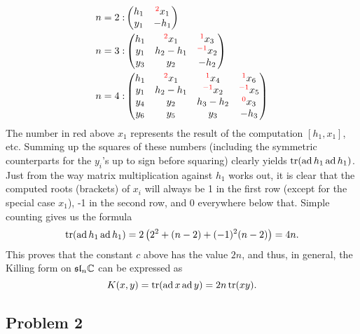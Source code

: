 \documentclass{../../mathnotes}
\begin{document}
\begin{align*}
    n=2: &
    \begin{pmatrix}
        h_1&^{\color{red}{2}}x_1\\y_1&-h_1
    \end{pmatrix}\\
    n=3: &
    \begin{pmatrix}
        h_1&^{\color{red}{2}}x_1&^{\color{red}{1}}x_3\\y_1&h_2-h_1&^{\color{red}{-1}}x_2\\y_3&y_2&-h_2
    \end{pmatrix}\\
    n=4: &
    \begin{pmatrix}
        h_1&^{\color{red}{2}}x_1&^{\color{red}{1}}x_4&^{\color{red}{1}}x_6\\y_1&h_2-h_1&^{\color{red}{-1}}x_2&^{\color{red}{-1}}x_5\\y_4&y_2&h_3-h_2&^{\color{red}{0}}x_3\\y_6&y_5&y_3&-h_3
    \end{pmatrix}
\end{align*}
The number in red above $x_1$ represents the result of the computation $[h_1,x_1]$, etc. Summing up the squares of these numbers (including the
symmetric counterparts for the $y_i$'s up to sign before squaring) clearly yields $\operatorname{tr}(\operatorname{ad} h_1\operatorname{ad} h_1)$. Just from the way matrix multiplication against
$h_1$ works out, it is clear that the computed roots (brackets) of $x_i$ will always be 1 in the first row (except for the special case $x_1$),
-1 in the second row, and 0 everywhere below that. Simple counting gives us the formula
\[\operatorname{tr}(\operatorname{ad} h_1\operatorname{ad} h_1)=2\left( 2^2+(n-2)+(-1)^2(n-2) \right)=4n.\]
This proves that the constant $c$ above has the value $2n$, and thus, in general, the Killing form on $\mathfrak{sl}_n\mathbb{C}$ can be expressed as 
\[K(x,y)=\operatorname{tr}(\operatorname{ad} x\operatorname{ad} y)=2n\operatorname{tr}(xy).\]

\subsection*{Problem 2}
\end{document}
